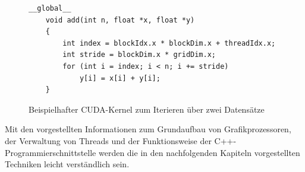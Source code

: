\begin{figure}[]
	\begin{lstlisting}[language=MyC++]
	__global__
	void add(int n, float *x, float *y)
	{
		int index = blockIdx.x * blockDim.x + threadIdx.x;
		int stride = blockDim.x * gridDim.x;
		for (int i = index; i < n; i += stride)
			y[i] = x[i] + y[i];
	}
	\end{lstlisting}
	\caption{Beispielhafter CUDA-Kernel zum Iterieren über zwei Datensätze \cite{Harris2017}}
	\label{cuda_example}
\end{figure}

Mit den vorgestellten Informationen zum Grundaufbau von Grafikprozessoren, der Verwaltung von Threads und der Funktionsweise der C++-Programmierschnittstelle werden die in den nachfolgenden Kapiteln vorgestellten Techniken leicht verständlich sein.